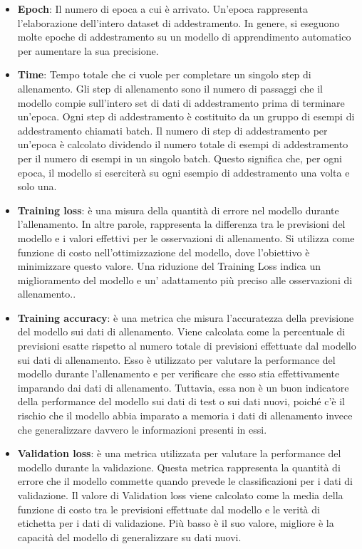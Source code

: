 \documentclass[a4paper,final,12pt]{report}
\begin{document}
\begin{itemize}
    \item \textbf{Epoch}: Il numero di epoca a cui è arrivato. Un'epoca rappresenta l'elaborazione dell'intero dataset di addestramento. In genere, si eseguono molte epoche di addestramento su un modello di apprendimento automatico per aumentare la sua precisione.
    \item \textbf{Time}: Tempo totale che ci vuole per completare un singolo step di allenamento. Gli step di allenamento sono il numero di passaggi che il modello compie sull'intero set di dati di addestramento prima di terminare un'epoca. Ogni step di addestramento è costituito da un gruppo di esempi di addestramento chiamati batch. Il numero di step di addestramento per un'epoca è calcolato dividendo il numero totale di esempi di addestramento per il numero di esempi in un singolo batch. Questo significa che, per ogni epoca, il modello si eserciterà su ogni esempio di addestramento una volta e solo una.
    \item \textbf{Training loss}: è una misura della quantità di errore nel modello durante l'allenamento. In altre parole, rappresenta la differenza tra le previsioni del modello e i valori effettivi per le osservazioni di allenamento. Si utilizza come funzione di costo nell'ottimizzazione del modello, dove l'obiettivo è minimizzare questo valore. Una riduzione del Training Loss indica un miglioramento del modello e un' adattamento più preciso alle osservazioni di allenamento..
    \item \textbf{Training accuracy}: è una metrica che misura l'accuratezza della previsione del modello sui dati di allenamento. Viene calcolata come la percentuale di previsioni esatte rispetto al numero totale di previsioni effettuate dal modello sui dati di allenamento. Esso è utilizzato per valutare la performance del modello durante l'allenamento e per verificare che esso stia effettivamente imparando dai dati di allenamento. Tuttavia, essa non è un buon indicatore della performance del modello sui dati di test o sui dati nuovi, poiché c'è il rischio che il modello abbia imparato a memoria i dati di allenamento invece che generalizzare davvero le informazioni presenti in essi.
    \item \textbf{Validation loss}: è una metrica utilizzata per valutare la performance del modello durante la validazione. Questa metrica rappresenta la quantità di errore che il modello commette quando prevede le classificazioni per i dati di validazione. Il valore di Validation loss viene calcolato come la media della funzione di costo tra le previsioni effettuate dal modello e le verità di etichetta per i dati di validazione. Più basso è il suo valore, migliore è la capacità del modello di generalizzare su dati nuovi.

\end{itemize}
\end{document}
